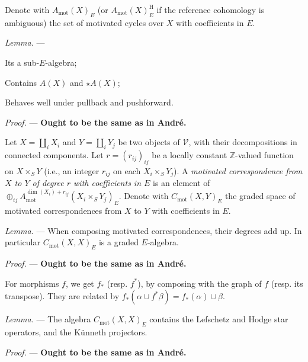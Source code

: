 \documentclass[a4paper,10pt]{article}
\def\fixme{\textbf}
\newenvironment{lemma}{\medskip\textit{Lemma.} --- }{}
\newenvironment{proof}{\textit{Proof.} --- }{\medskip}
\def\basepieces{\mathscr{V}}
\def\coh{\mathrm{H}}
\def\cycmot{A_{\mathrm{mot}}}
\def\cormot{C_{\mathrm{mot}}}
\begin{document}
Denote with $\cycmot(X)_{E}$ (or $\cycmot(X)_{E}^{\coh}$ if the reference
cohomology is ambiguous) the set of motivated cycles over $X$ with coefficients
in $E$.

\begin{lemma} %
	\begin{enumerate*}[label=(\alph*)] %
		\item Its a sub-$E$-algebra;
		\item Contains $A(X)$ and $\star A(X)$;
		\item Behaves well under pullback and pushforward.
	\end{enumerate*} %

	\begin{proof} %
		\fixme{Ought to be the same as in Andr\'{e}.}
	\end{proof} %
\end{lemma} %

Let $X = \coprod_{i} X_{i}$ and $Y = \coprod_{i} Y_{j}$ be two objects of
$\basepieces$, with their decompositions in connected components. Let $r =
(r_{ij})_{ij}$ be a locally constant $\mathbb{Z}$-valued function on $X
\times_{S} Y$ (i.e., an integer $r_{ij}$ on each $X_{i} \times_{S} Y_{j}$). A
\emph{motivated correspondence from $X$ to $Y$ of degree $r$ with coefficients
in $E$} is an element of $\oplus_{ij} \cycmot^{\dim(X_{i}) + r_{ij}}(X_{i}
\times_{S} Y_{j})_{E}$. Denote with $\cormot(X,Y)_{E}$ the graded space of
motivated correspondences from $X$ to $Y$ with coefficients in $E$.

\begin{lemma} %
	When composing motivated correspondences, their degrees add up. In
	particular $\cormot(X,X)_{E}$ is a graded $E$-algebra.

	\begin{proof} %
		\fixme{Ought to be the same as in Andr\'{e}.}
	\end{proof} %
\end{lemma} %

For morphisms $f$, we get $f_{*}$ (resp. $f^{*}$), by composing with the graph
of $f$ (resp. its transpose). They are related by $f_{*}(\alpha \cup f^{*}
\beta) = f_{*}(\alpha) \cup \beta$.

\begin{lemma} %
	The algebra $\cormot(X,X)_{E}$ contains the Lefschetz and Hodge star
	operators, and the K\"{u}nneth projectors.

	\begin{proof} %
		\fixme{Ought to be the same as in Andr\'{e}.}
	\end{proof} %
\end{lemma} %
\end{document}

